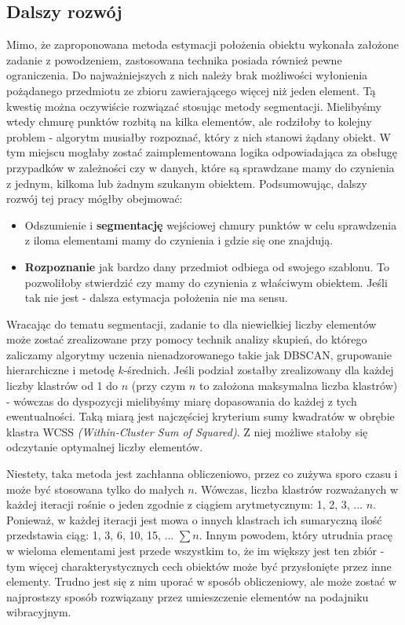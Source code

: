 \documentclass[12pt]{article}
\begin{document}
\subsection{Dalszy rozwój}
Mimo, że zaproponowana metoda estymacji położenia obiektu wykonała założone zadanie z powodzeniem, zastosowana technika posiada również pewne ograniczenia. Do najważniejszych z nich należy brak możliwości wyłonienia pożądanego przedmiotu ze zbioru zawierającego więcej niż jeden element. Tą kwestię można oczywiście rozwiązać stosując metody segmentacji. Mielibyśmy wtedy chmurę punktów rozbitą na kilka elementów, ale rodziłoby to kolejny problem - algorytm musiałby rozpoznać, który z nich stanowi żądany obiekt. W tym miejscu mogłaby zostać zaimplementowana logika odpowiadająca za obsługę przypadków w zależności czy w danych, które są sprawdzane mamy do czynienia z jednym, kilkoma lub żadnym szukanym obiektem. Podsumowując, dalszy rozwój tej pracy mógłby obejmować:

\begin{itemize}
\item Odszumienie i \textbf{segmentację} wejściowej chmury punktów w celu sprawdzenia z iloma elementami mamy do czynienia i gdzie się one znajdują.

\item \textbf{Rozpoznanie} jak bardzo dany przedmiot odbiega od swojego szablonu. To pozwoliłoby stwierdzić czy mamy do czynienia z właściwym obiektem. Jeśli tak nie jest - dalsza estymacja położenia nie ma sensu.
\end{itemize}

Wracając do tematu segmentacji, zadanie to dla niewielkiej liczby elementów może zostać zrealizowane przy pomocy technik analizy skupień, do którego zaliczamy algorytmy uczenia nienadzorowanego takie jak DBSCAN, grupowanie hierarchiczne i metodę $k$-średnich. Jeśli podział zostałby zrealizowany dla każdej liczby klastrów od 1 do $n$ (przy czym $n$ to założona maksymalna liczba klastrów) - wówczas do dyspozycji mielibyśmy miarę dopasowania do każdej z tych ewentualności. Taką miarą jest najczęściej kryterium sumy kwadratów w obrębie klastra WCSS \emph{(Within-Cluster Sum of Squared)}. Z niej możliwe stałoby się odczytanie optymalnej liczby elementów. 

Niestety, taka metoda jest zachłanna obliczeniowo, przez co zużywa sporo czasu i może być stosowana tylko do małych $n$. Wówczas, liczba klastrów rozważanych w każdej iteracji rośnie o jeden zgodnie z ciągiem arytmetycznym: 1, 2, 3, ... $n$. Ponieważ, w każdej iteracji jest mowa o innych klastrach ich sumaryczną ilość przedstawia ciąg: 1, 3, 6, 10, 15, ... $\sum n$. Innym powodem, który utrudnia pracę w wieloma elementami jest przede wszystkim to, że im większy jest ten zbiór - tym więcej charakterystycznych cech obiektów może być przysłonięte przez inne elementy. Trudno jest się z nim uporać w sposób obliczeniowy, ale może zostać w najprostszy sposób rozwiązany przez umieszczenie elementów na podajniku wibracyjnym.
\end{document}
